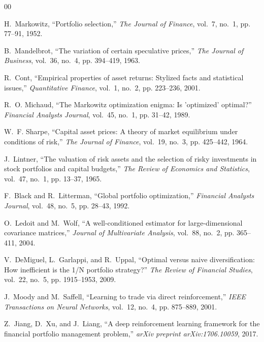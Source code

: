 \documentclass[conference]{IEEEtran}
\begin{document}

\begin{thebibliography}{00}

H.~Markowitz, ``Portfolio selection,'' \emph{The Journal of Finance}, vol.~7, no.~1, pp. 77--91, 1952.

B.~Mandelbrot, ``The variation of certain speculative prices,'' \emph{The Journal of Business}, vol.~36, no.~4, pp. 394--419, 1963.

R.~Cont, ``Empirical properties of asset returns: Stylized facts and statistical issues,'' \emph{Quantitative Finance}, vol.~1, no.~2, pp. 223--236, 2001.

R.~O. Michaud, ``The Markowitz optimization enigma: Is 'optimized' optimal?'' \emph{Financial Analysts Journal}, vol.~45, no.~1, pp. 31--42, 1989.

W.~F. Sharpe, ``Capital asset prices: A theory of market equilibrium under conditions of risk,'' \emph{The Journal of Finance}, vol.~19, no.~3, pp. 425--442, 1964.

J.~Lintner, ``The valuation of risk assets and the selection of risky investments in stock portfolios and capital budgets,'' \emph{The Review of Economics and Statistics}, vol.~47, no.~1, pp. 13--37, 1965.

F.~Black and R.~Litterman, ``Global portfolio optimization,'' \emph{Financial Analysts Journal}, vol.~48, no.~5, pp. 28--43, 1992.

O.~Ledoit and M.~Wolf, ``A well-conditioned estimator for large-dimensional covariance matrices,'' \emph{Journal of Multivariate Analysis}, vol.~88, no.~2, pp. 365--411, 2004.

V.~DeMiguel, L.~Garlappi, and R.~Uppal, ``Optimal versus naive diversification: How inefficient is the 1/N portfolio strategy?'' \emph{The Review of Financial Studies}, vol.~22, no.~5, pp. 1915--1953, 2009.

J.~Moody and M.~Saffell, ``Learning to trade via direct reinforcement,'' \emph{IEEE Transactions on Neural Networks}, vol.~12, no.~4, pp. 875--889, 2001.

Z.~Jiang, D.~Xu, and J.~Liang, ``A deep reinforcement learning framework for the financial portfolio management problem,'' \emph{arXiv preprint arXiv:1706.10059}, 2017.


\end{thebibliography}
\end{document}
